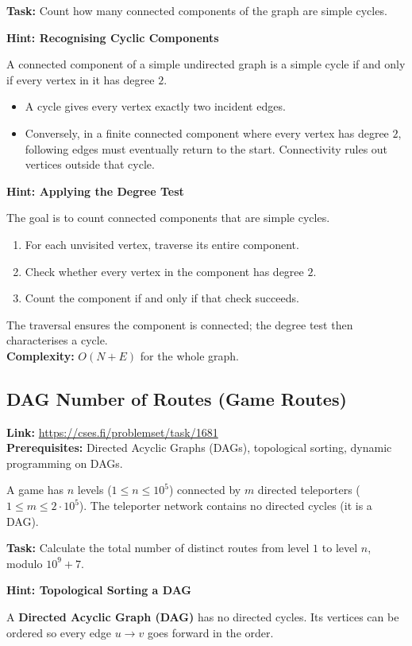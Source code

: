 \documentclass[12pt]{article}
\begin{document}
\textbf{Task:} Count how many connected components of the graph are simple cycles.

\textbf{Hint: Recognising Cyclic Components}

A connected component of a simple undirected graph is a simple cycle if and only if every vertex in it has degree $2$.
\begin{itemize}
    \item A cycle gives every vertex exactly two incident edges.
    \item Conversely, in a finite connected component where every vertex has degree $2$, following edges must eventually return to the start. Connectivity rules out vertices outside that cycle.
\end{itemize}

\textbf{Hint: Applying the Degree Test}

The goal is to count connected components that are simple cycles.
\begin{enumerate}
    \item For each unvisited vertex, traverse its entire component.
    \item Check whether every vertex in the component has degree $2$.
    \item Count the component if and only if that check succeeds.
\end{enumerate}
The traversal ensures the component is connected; the degree test then characterises a cycle.\\[0.4em]
\textbf{Complexity:} $O(N+E)$ for the whole graph.

\subsection{DAG Number of Routes (Game Routes)}
\textbf{Link:} \url{https://cses.fi/problemset/task/1681} \\
\textbf{Prerequisites:} Directed Acyclic Graphs (DAGs), topological sorting, dynamic programming on DAGs.

A game has $n$ levels ($1 \le n \le 10^5$) connected by $m$ directed teleporters ($1 \le m \le 2 \cdot 10^5$). The teleporter network contains no directed cycles (it is a DAG).

\textbf{Task:} Calculate the total number of distinct routes from level $1$ to level $n$, modulo $10^9 + 7$.

\textbf{Hint: Topological Sorting a DAG}

A \textbf{Directed Acyclic Graph (DAG)} has no directed cycles. Its vertices can be ordered so every edge $u \to v$ goes forward in the order.
\end{document}
